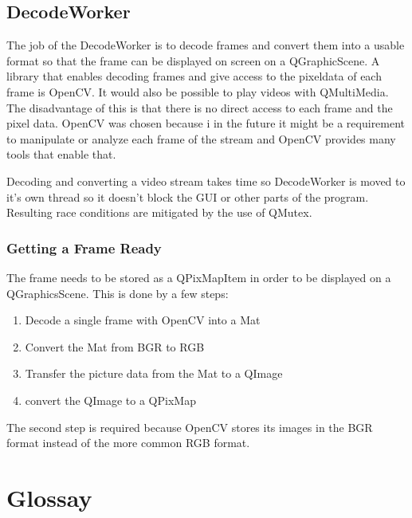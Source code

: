 \subsection{DecodeWorker}
\label{sec:decodeWorker}
The job of the DecodeWorker is to decode frames and convert them into a usable format so that the frame can be displayed on screen on a QGraphicScene. A library that enables decoding frames and give access to the pixeldata of each frame is OpenCV. It would also be possible to play videos with QMultiMedia. The disadvantage of this is that there is no direct access to each frame and the pixel data. OpenCV was chosen because i in the future it might be a requirement to manipulate or analyze each frame of the stream and OpenCV provides many tools that enable that.

Decoding and converting a video stream takes time so DecodeWorker is moved to it's own thread so it doesn't block the GUI or other parts of the program. Resulting race conditions are mitigated by the use of QMutex.

\subsubsection{Getting a Frame Ready}
\label{sec:gettingAFrameReady}
The frame needs to be stored as a QPixMapItem in order to be displayed on a QGraphicsScene. This is done by a few steps:
\begin{enumerate}
	\item Decode a single frame with OpenCV into a Mat
	\item Convert the Mat from BGR to RGB
	\item Transfer the picture data from the Mat to a QImage
	\item convert the QImage to a QPixMap
\end{enumerate}

The second step is required because OpenCV stores its images in the BGR format instead of the more common RGB format.


\section{Glossay}
\label{sec:instructions_glossay}

